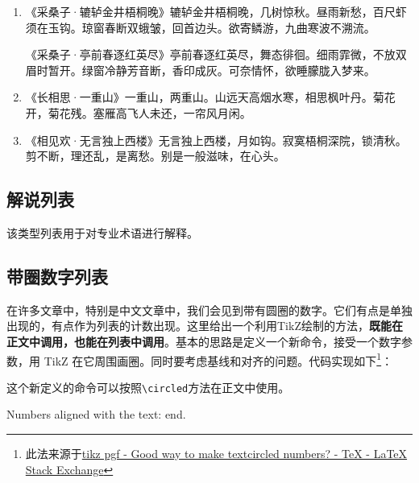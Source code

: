 \begin{enumerate}[label=(\zhnum*),itemsep=0pt,parsep=0pt,topsep=0pt,leftmargin=0pt,labelindent=\parindent,listparindent=\parindent,itemindent=*]
\item 《采桑子·辘轳金井梧桐晚》辘轳金井梧桐晚，几树惊秋。昼雨新愁，百尺虾须在玉钩。琼窗春断双蛾皱，回首边头。欲寄鳞游，九曲寒波不溯流。\par
《采桑子·亭前春逐红英尽》亭前春逐红英尽，舞态徘徊。细雨霏微，不放双眉时暂开。绿窗冷静芳音断，香印成灰。可奈情怀，欲睡朦胧入梦来。
\item 《长相思·一重山》一重山，两重山。山远天高烟水寒，相思枫叶丹。菊花开，菊花残。塞雁高飞人未还，一帘风月闲。 
\item 《相见欢·无言独上西楼》无言独上西楼，月如钩。寂寞梧桐深院，锁清秋。剪不断，理还乱，是离愁。别是一般滋味，在心头。
\end{enumerate}

\subsection{解说列表}
该类型列表用于对专业术语进行解释。

\subsection{带圈数字列表}

在许多文章中，特别是中文文章中，我们会见到带有圆圈的数字。它们有点是单独出现的，有点作为列表的计数出现。这里给出一个利用TikZ绘制的方法，\textbf{既能在正文中调用，也能在列表中调用}。基本的思路是定义一个新命令，接受一个数字参数，用 TikZ 在它周围画圈。同时要考虑基线和对齐的问题。代码实现如下\footnote{此法来源于\href{http://tex.stackexchange.com/questions/7032/good-way-to-make-textcircled-numbers}{tikz pgf - Good way to make textcircled numbers? - TeX - LaTeX Stack Exchange}}：

\begin{latex}
\usepackage{tikz}
\usepackage{etoolbox}
\newcommand{\circled}[2][]{\tikz[baseline=(char.base)]
    {\node[shape = circle, draw, inner sep = 1pt]
        (char) {\phantom{\ifblank{#1}{#2}{#1}}};%
        \node at (char.center) {\makebox[0pt][c]{#2}};}}
\robustify{\circled}
\end{latex}

这个新定义的命令可以按照\lstinline|\circled|方法在正文中使用。

\begin{codeshow}
Numbers aligned with the text:     end.
\end{codeshow}

